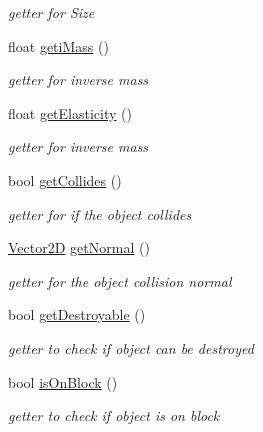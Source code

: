 \begin{DoxyCompactItemize}
\begin{DoxyCompactList}\small\item\em getter for Size \end{DoxyCompactList}\item 
\hypertarget{class_collidable_a21f2f59df50b13723bfc7c167d3614d3}{float \hyperlink{class_collidable_a21f2f59df50b13723bfc7c167d3614d3}{geti\-Mass} ()}\label{class_collidable_a21f2f59df50b13723bfc7c167d3614d3}

\begin{DoxyCompactList}\small\item\em getter for inverse mass \end{DoxyCompactList}\item 
\hypertarget{class_collidable_a8f451370b264406212293a85254b4607}{float \hyperlink{class_collidable_a8f451370b264406212293a85254b4607}{get\-Elasticity} ()}\label{class_collidable_a8f451370b264406212293a85254b4607}

\begin{DoxyCompactList}\small\item\em getter for inverse mass \end{DoxyCompactList}\item 
\hypertarget{class_collidable_ad113f88a919c673d5218cee40a117eb9}{bool \hyperlink{class_collidable_ad113f88a919c673d5218cee40a117eb9}{get\-Collides} ()}\label{class_collidable_ad113f88a919c673d5218cee40a117eb9}

\begin{DoxyCompactList}\small\item\em getter for if the object collides \end{DoxyCompactList}\item 
\hypertarget{class_collidable_aee477493750640c92e2de6e447d26c44}{\hyperlink{class_vector2_d}{Vector2\-D} \hyperlink{class_collidable_aee477493750640c92e2de6e447d26c44}{get\-Normal} ()}\label{class_collidable_aee477493750640c92e2de6e447d26c44}

\begin{DoxyCompactList}\small\item\em getter for the object collision normal \end{DoxyCompactList}\item 
\hypertarget{class_collidable_a152b6a93fce0b03b1bff9130512fd505}{bool \hyperlink{class_collidable_a152b6a93fce0b03b1bff9130512fd505}{get\-Destroyable} ()}\label{class_collidable_a152b6a93fce0b03b1bff9130512fd505}

\begin{DoxyCompactList}\small\item\em getter to check if object can be destroyed \end{DoxyCompactList}\item 
\hypertarget{class_collidable_ade580996de9c2b10d38b1a7487816bad}{bool \hyperlink{class_collidable_ade580996de9c2b10d38b1a7487816bad}{is\-On\-Block} ()}\label{class_collidable_ade580996de9c2b10d38b1a7487816bad}

\begin{DoxyCompactList}\small\item\em getter to check if object is on block \end{DoxyCompactList}\end{DoxyCompactItemize}
